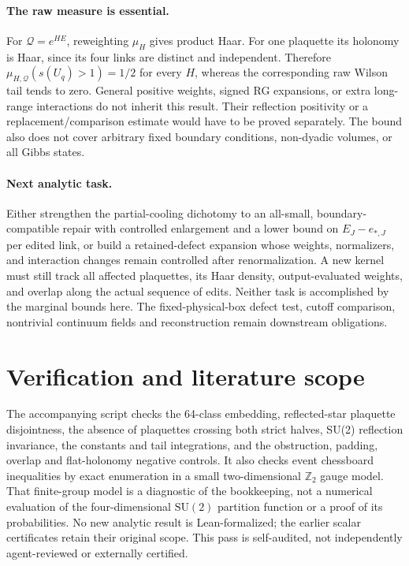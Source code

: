 \documentclass[11pt]{article}
\theoremstyle{remark}
\newcommand{\SU}{\mathrm{SU}(2)}
\begin{document}
\paragraph{The raw measure is essential.}
For $\mathcal Q=e^{HE}$, reweighting $\mu_H$ gives product Haar. For one
plaquette its holonomy is Haar, since its four links are distinct and
independent. Therefore
$\mu_{H,\mathcal Q}(s(U_q)>1)=1/2$ for every $H$, whereas the corresponding
raw Wilson tail tends to zero. General positive weights, signed RG
expansions, or extra long-range interactions do not inherit this result.
Their reflection positivity or a replacement/comparison estimate would
have to be proved separately. The bound also does not cover arbitrary
fixed boundary conditions, non-dyadic volumes, or all Gibbs states.

\paragraph{Next analytic task.}
Either strengthen the partial-cooling dichotomy to an all-small,
boundary-compatible repair with controlled enlargement and a lower bound on
$E_J-e_{*,J}$ per edited link, or build a retained-defect expansion whose
weights, normalizers, and interaction changes remain controlled after
renormalization. A new kernel must still track all affected plaquettes,
its Haar density, output-evaluated weights, and overlap along the actual
sequence of edits. Neither task is accomplished by the marginal bounds
here. The fixed-physical-box defect test, cutoff comparison, nontrivial
continuum fields and reconstruction remain downstream obligations.

\section{Verification and literature scope}
The accompanying script checks the 64-class embedding, reflected-star
plaquette disjointness, the absence of plaquettes crossing both strict
halves, SU(2) reflection invariance, the constants and tail integrations,
and the obstruction, padding, overlap and flat-holonomy negative controls.
It also checks event chessboard inequalities by exact enumeration in a
small two-dimensional $\mathbb Z_2$ gauge model. That finite-group model is
a diagnostic of the bookkeeping, not a numerical evaluation of the
four-dimensional $\SU$ partition function or a proof of its probabilities.
No new analytic result is Lean-formalized; the earlier scalar certificates
retain their original scope. This pass is self-audited, not independently
agent-reviewed or externally certified.
\end{document}
